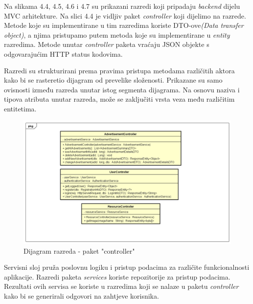                 \noindent Na slikama 4.4, 4.5, 4.6 i 4.7 su prikazani razredi koji pripadaju \textit{backend} dijelu MVC arhitekture. Na slici 4.4 je vidljiv paket \textit{controller} koji dijelimo na razrede. Metode koje su implementirane u tim razredima koriste DTO-ove\textit{(Data transfer object)}, a njima pristupamo putem metoda koje su implementirane u \textit{entity} razredima. Metode unutar \textit{controller} paketa vraćaju JSON objekte s odgovarajućim HTTP status kodovima.
			
			Razredi su strukturirani prema pravima pristupa metodama            različitih aktora kako bi se rasteretio dijagram od prevelike       složenosti. Prikazane su samo ovisnosti između razreda unutar       istog segmenta dijagrama. Na osnovu naziva i tipova atributa        unutar razreda, može se zaključiti vrsta veza među različitim       entitetima.

			\begin{figure}[htb]
				\centering
				\includegraphics[width=\textwidth]{slike/dr1_kontroleri.png}
				\caption{Dijagram razreda - paket "controller"}
			\end{figure}
			\pagebreak

                Servisni sloj pruža poslovnu logiku i pristup podacima za različite funkcionalnosti aplikacije. Razredi paketa \textit{services} koriste repozitorije za pristup podacima. Rezultati ovih servisa se koriste u razredima koji se nalaze u paketu \textit{controller} kako bi se generirali odgovori na zahtjeve korisnika.
   
